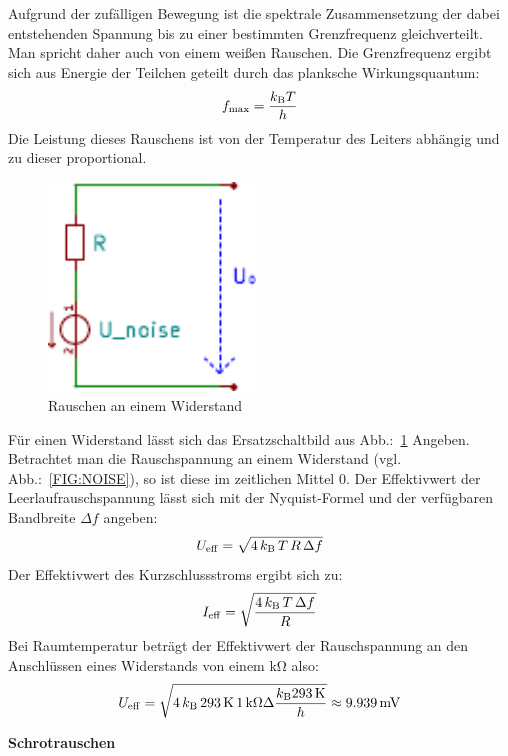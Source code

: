 Aufgrund der zufälligen Bewegung ist die spektrale Zusammensetzung der dabei
entstehenden Spannung bis zu einer bestimmten Grenzfrequenz gleichverteilt.
Man spricht daher auch von einem weißen Rauschen.
Die Grenzfrequenz ergibt sich aus Energie der Teilchen geteilt durch das 
planksche Wirkungsquantum:
\[f_{\max} = \frac{k_{\rm B} T}{h}\]
Die Leistung dieses Rauschens ist von der Temperatur des Leiters abhängig und
zu dieser proportional.

\begin{figure}
  \centering
  \includegraphics[clip, width=0.49\textwidth]
  {./../common/schaltungen/widerstandsrauschen/widerstandsrauschen.pdf}
  \caption{Rauschen an einem Widerstand}\label{FIG:NOISEESB}
\end{figure}
Für einen Widerstand lässt sich das Ersatzschaltbild aus 
Abb.:~\ref{FIG:NOISEESB} Angeben.
Betrachtet man die Rauschspannung an einem Widerstand 
(vgl. Abb.:~\ref{FIG:NOISE}), so ist diese im zeitlichen Mittel 0.
Der Effektivwert der Leerlaufrauschspannung lässt sich mit der Nyquist-Formel 
und der verfügbaren Bandbreite $\Delta f$ angeben\cite[Nyquist]{Art:NYQUIST}:
\[U_{\rm eff} = \sqrt{4\, k_{\rm B}\, T\, R\, \Delta f}\]
Der Effektivwert des Kurzschlussstroms ergibt sich zu:
\[I_{\rm eff} = \sqrt{\frac{4\,k_{\rm B}\, T\, \Delta f}{R}}\]
Bei Raumtemperatur beträgt der Effektivwert der Rauschspannung an den 
Anschlüssen eines Widerstands von einem \si{\kilo\ohm} also:
\[U_{\rm eff} = 
\sqrt{4\, k_{\rm B}\, 293\,\si{\kelvin}\, 1\,\si{\kilo\ohm} \Delta 
\frac{k_{\rm B} 293\,\si{\kelvin}}{h}} \approx 9.939\,\si{\milli\volt}\]

\textbf{Schrotrauschen}

